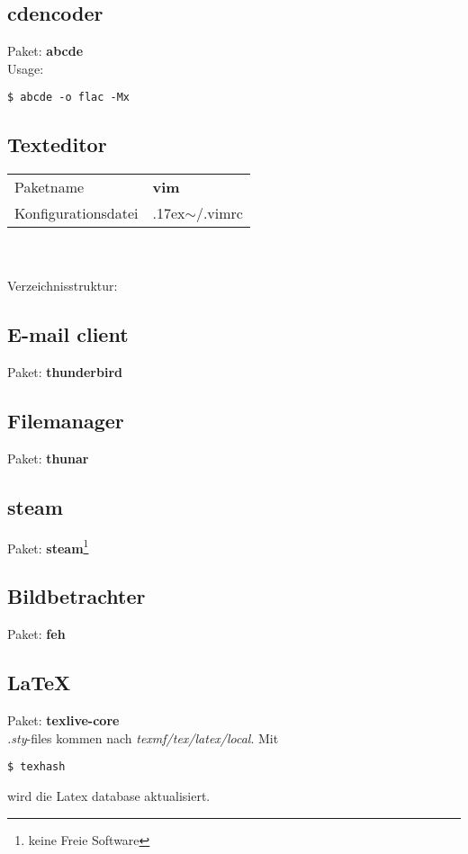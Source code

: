 \subsection{cdencoder}
Paket: \textbf{abcde}  \\ 
Usage:
\begin{lstlisting}[style=Bash]
$ abcde -o flac -Mx
\end{lstlisting}

\subsection{Texteditor}
\begin{tabular}{l|l}
Paketname & \textbf{vim} \\ 
Konfigurationsdatei & {{\raise.17ex\hbox{$\scriptstyle\mathtt{\sim}$}}/.vimrc} \\
\end{tabular}
\\ \\
Verzeichnisstruktur:  

\subsection{E-mail client}
Paket: \textbf{thunderbird}

\subsection{Filemanager}
Paket: \textbf{thunar} 

\subsection{steam}
Paket: \textbf{steam}\footnote{keine Freie Software} 

\subsection{Bildbetrachter}
Paket: \textbf{feh}

\subsection{\LaTeX}
Paket: \textbf{texlive-core} \\
\emph{.sty}-files kommen nach \emph{texmf/tex/latex/local}.
Mit 
\begin{lstlisting}[style=Bash]
$ texhash
\end{lstlisting}
wird die Latex database aktualisiert.
